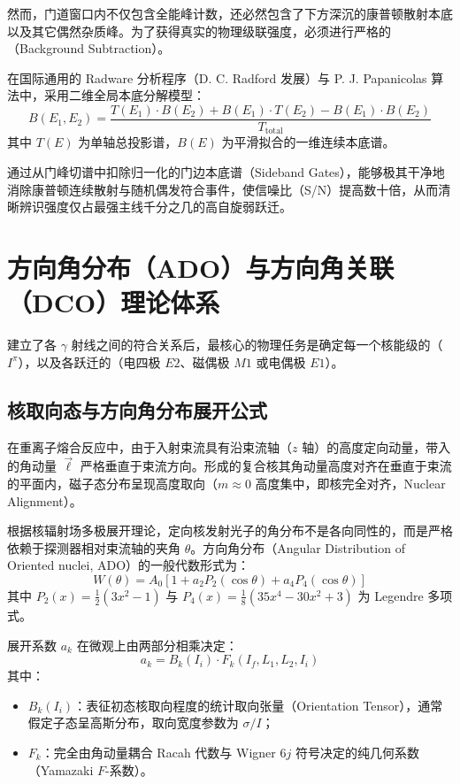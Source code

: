 然而，门道窗口内不仅包含全能峰计数，还必然包含了下方深沉的康普顿散射本底以及其它偶然杂质峰。为了获得真实的物理级联强度，必须进行严格的（Background Subtraction）。

在国际通用的 Radware 分析程序（D. C. Radford 发展）与 P. J. Papanicolas 算法中，采用二维全局本底分解模型：
\begin{equation}
    B(E_1, E_2) = \frac{T(E_1) \cdot B(E_2) + B(E_1) \cdot T(E_2) - B(E_1) \cdot B(E_2)}{T_{\text{total}}}
    \label{eq:matrix_background}
\end{equation}
其中 $T(E)$ 为单轴总投影谱，$B(E)$ 为平滑拟合的一维连续本底谱。

通过从门峰切谱中扣除归一化的门边本底谱（Sideband Gates），能够极其干净地消除康普顿连续散射与随机偶发符合事件，使信噪比（S/N）提高数十倍，从而清晰辨识强度仅占最强主线千分之几的高自旋弱跃迁。

\section{方向角分布（ADO）与方向角关联（DCO）理论体系}
\label{sec:dco_formalism}

建立了各 $\gamma$ 射线之间的符合关系后，最核心的物理任务是确定每一个核能级的（$I^\pi$），以及各跃迁的（电四极 $E2$、磁偶极 $M1$ 或电偶极 $E1$）。

\subsection{核取向态与方向角分布展开公式}

在重离子熔合反应中，由于入射束流具有沿束流轴（$z$ 轴）的高度定向动量，带入的角动量 $\vec{\ell}$ 严格垂直于束流方向。形成的复合核其角动量高度对齐在垂直于束流的平面内，磁子态分布呈现高度取向（$m \approx 0$ 高度集中，即核完全对齐，Nuclear Alignment）。

根据核辐射场多极展开理论，定向核发射光子的角分布不是各向同性的，而是严格依赖于探测器相对束流轴的夹角 $\theta$。方向角分布（Angular Distribution of Oriented nuclei, ADO）的一般代数形式为：
\begin{equation}
    W(\theta) = A_0 \left[ 1 + a_2 P_2(\cos\theta) + a_4 P_4(\cos\theta) \right]
    \label{eq:angular_distribution}
\end{equation}
其中 $P_2(x) = \frac{1}{2}(3x^2 - 1)$ 与 $P_4(x) = \frac{1}{8}(35x^4 - 30x^2 + 3)$ 为 Legendre 多项式。

展开系数 $a_k$ 在微观上由两部分相乘决定：
\begin{equation}
    a_k = B_k(I_i) \cdot F_k(I_f, L_1, L_2, I_i)
\end{equation}
其中：
\begin{itemize}
    \item $B_k(I_i)$：表征初态核取向程度的统计取向张量（Orientation Tensor），通常假定子态呈高斯分布，取向宽度参数为 $\sigma/I$；
    \item $F_k$：完全由角动量耦合 Racah 代数与 Wigner $6j$ 符号决定的纯几何系数（Yamazaki $F$-系数）。
\end{itemize}

